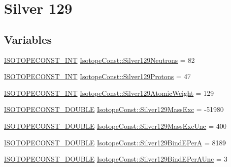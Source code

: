 \hypertarget{group___isotope_const-_silver-_ag129}{}\section{Silver 129}
\label{group___isotope_const-_silver-_ag129}
\subsection*{Variables}
\begin{DoxyCompactItemize}
\item 
\mbox{\hyperlink{group___isotope_const-_macros_ga5f18360b3e99483a35c32d789e62621c}{I\+S\+O\+T\+O\+P\+E\+C\+O\+N\+S\+T\+\_\+\+I\+NT}} \mbox{\hyperlink{group___isotope_const-_silver-_ag129_gaa676c8ac1a73f7e9466d5d29a5462faf}{Isotope\+Const\+::\+Silver129\+Neutrons}} = 82
\item 
\mbox{\hyperlink{group___isotope_const-_macros_ga5f18360b3e99483a35c32d789e62621c}{I\+S\+O\+T\+O\+P\+E\+C\+O\+N\+S\+T\+\_\+\+I\+NT}} \mbox{\hyperlink{group___isotope_const-_silver-_ag129_ga2b751e9f4e14a040cc00c69f4f68adf8}{Isotope\+Const\+::\+Silver129\+Protons}} = 47
\item 
\mbox{\hyperlink{group___isotope_const-_macros_ga5f18360b3e99483a35c32d789e62621c}{I\+S\+O\+T\+O\+P\+E\+C\+O\+N\+S\+T\+\_\+\+I\+NT}} \mbox{\hyperlink{group___isotope_const-_silver-_ag129_gae89307afec21a048161e699e1275ce15}{Isotope\+Const\+::\+Silver129\+Atomic\+Weight}} = 129
\item 
\mbox{\hyperlink{group___isotope_const-_macros_ga8f45a7272ce02c0b4c65c44636ed719a}{I\+S\+O\+T\+O\+P\+E\+C\+O\+N\+S\+T\+\_\+\+D\+O\+U\+B\+LE}} \mbox{\hyperlink{group___isotope_const-_silver-_ag129_gae6b6d4a7254ee4c1d663635318195e8f}{Isotope\+Const\+::\+Silver129\+Mass\+Exc}} = -\/51980
\item 
\mbox{\hyperlink{group___isotope_const-_macros_ga8f45a7272ce02c0b4c65c44636ed719a}{I\+S\+O\+T\+O\+P\+E\+C\+O\+N\+S\+T\+\_\+\+D\+O\+U\+B\+LE}} \mbox{\hyperlink{group___isotope_const-_silver-_ag129_gacaee3e06f38867e6f89c9ea45b7d13e0}{Isotope\+Const\+::\+Silver129\+Mass\+Exc\+Unc}} = 400
\item 
\mbox{\hyperlink{group___isotope_const-_macros_ga8f45a7272ce02c0b4c65c44636ed719a}{I\+S\+O\+T\+O\+P\+E\+C\+O\+N\+S\+T\+\_\+\+D\+O\+U\+B\+LE}} \mbox{\hyperlink{group___isotope_const-_silver-_ag129_gacff859a6f527d7e5150909c1d48c2904}{Isotope\+Const\+::\+Silver129\+Bind\+E\+PerA}} = 8189
\item 
\mbox{\hyperlink{group___isotope_const-_macros_ga8f45a7272ce02c0b4c65c44636ed719a}{I\+S\+O\+T\+O\+P\+E\+C\+O\+N\+S\+T\+\_\+\+D\+O\+U\+B\+LE}} \mbox{\hyperlink{group___isotope_const-_silver-_ag129_ga8079391999c1c52e39b3d13c6df20b10}{Isotope\+Const\+::\+Silver129\+Bind\+E\+Per\+A\+Unc}} = 3

\end{DoxyCompactItemize}
